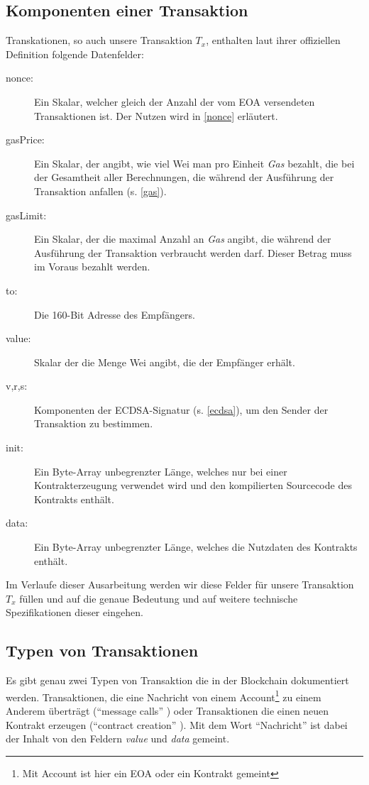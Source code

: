 \documentclass[runningheads]{llncs}
\begin{document}
\subsection{Komponenten einer Transaktion}
\label{komponenten}
Transkationen, so auch unsere Transaktion $T_x$, enthalten laut ihrer offiziellen Definition \cite[S. 4]{wood_ethereum/yellowpaper_2019} folgende Datenfelder:
\begin{description}
  \item[nonce:] Ein Skalar, welcher gleich der Anzahl der vom EOA versendeten Transaktionen ist. Der Nutzen wird in \ref{nonce} erläutert.
  \item[gasPrice:] Ein Skalar, der angibt, wie viel Wei man pro Einheit \textit{Gas} bezahlt, die bei der Gesamtheit aller Berechnungen, die während der Ausführung der Transaktion anfallen (s. \ref{gas}).
  \item[gasLimit:] Ein Skalar, der die maximal Anzahl an \textit{Gas} angibt, die während der Ausführung der Transaktion verbraucht werden darf. Dieser Betrag muss im Voraus bezahlt werden.
  \item[to:] Die 160-Bit Adresse des Empfängers.
  \item[value:] Skalar der die Menge Wei angibt, die der Empfänger erhält.
  \item[v,r,s:] Komponenten der ECDSA-Signatur (s. \ref{ecdsa}), um den Sender der Transaktion zu bestimmen.
  \item[init:] Ein Byte-Array unbegrenzter Länge, welches nur bei einer Kontrakterzeugung verwendet wird und den kompilierten Sourcecode des Kontrakts enthält.
  \item[data:] Ein Byte-Array unbegrenzter Länge, welches die Nutzdaten des Kontrakts enthält.
\end{description}
Im Verlaufe dieser Ausarbeitung werden wir diese Felder für unsere Transaktion $T_x$ füllen und auf die genaue Bedeutung und auf weitere technische Spezifikationen dieser eingehen.


\subsection{Typen von Transaktionen}
\label{types}
Es gibt genau zwei Typen von Transaktion die in der Blockchain dokumentiert werden. Transaktionen, die eine Nachricht von einem Account\footnote{Mit Account ist hier ein EOA oder ein Kontrakt gemeint} zu einem Anderem überträgt ("`message calls"' \cite[S. 4]{wood_ethereum/yellowpaper_2019}) oder Transaktionen die einen neuen Kontrakt erzeugen ("`contract creation"' \cite[S. 4]{wood_ethereum/yellowpaper_2019}). Mit dem Wort "`Nachricht"' ist dabei der Inhalt von den Feldern \textit{value} und \textit{data} gemeint.
\end{document}
